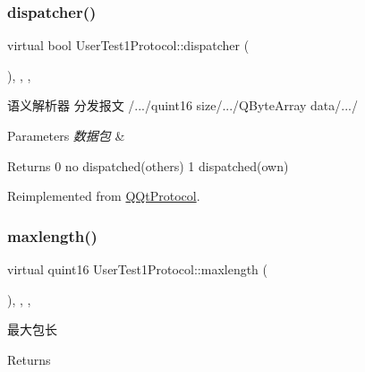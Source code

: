\subsubsection{\texorpdfstring{dispatcher()}{dispatcher()}}
{\footnotesize\ttfamily virtual bool User\+Test1\+Protocol\+::dispatcher (\begin{DoxyParamCaption}\item[{const Q\+Byte\+Array \&}]{ }\end{DoxyParamCaption})\hspace{0.3cm}{\ttfamily [inline]}, {\ttfamily [override]}, {\ttfamily [protected]}, {\ttfamily [virtual]}}



语义解析器 分发报文 /.../quint16 size/.../\+Q\+Byte\+Array data/.../ 


\begin{DoxyParams}{Parameters}
{\em 数据包} & \\
\hline
\end{DoxyParams}
\begin{DoxyReturn}{Returns}
0 no dispatched(others) 1 dispatched(own) 
\end{DoxyReturn}


Reimplemented from \mbox{\hyperlink{class_q_qt_protocol_a35a69c4b89c8cf7459038f40d75e0dc9}{Q\+Qt\+Protocol}}.

\mbox{\label{class_user_test1_protocol_ad22de22fb36be08a6c9e3c42d95e4aca}} 
\subsubsection{\texorpdfstring{maxlength()}{maxlength()}}
{\footnotesize\ttfamily virtual quint16 User\+Test1\+Protocol\+::maxlength (\begin{DoxyParamCaption}{ }\end{DoxyParamCaption})\hspace{0.3cm}{\ttfamily [inline]}, {\ttfamily [override]}, {\ttfamily [protected]}, {\ttfamily [virtual]}}



最大包长 

\begin{DoxyReturn}{Returns}

\end{DoxyReturn}


